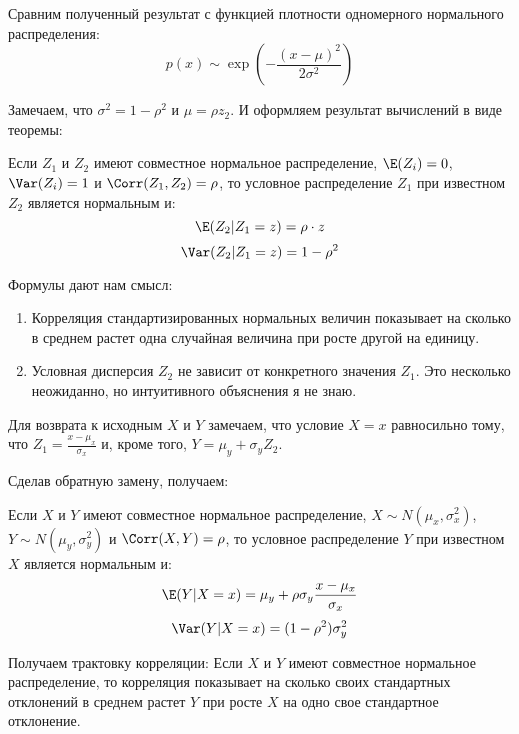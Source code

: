 Сравним полученный результат с функцией плотности одномерного нормального распределения:
\begin{equation}
p(x)\sim\exp\left(-\frac{(x-\mu)^{2}}{2\sigma^{2}}\right)
\end{equation}

Замечаем, что $\sigma^{2}=1-\rho^{2}$ и $\mu=\rho z_{2}$. И оформляем результат вычислений в виде теоремы:
\begin{myth}
Если $Z_{1}$ и $Z_{2}$ имеют совместное нормальное распределение, $\E(Z_{i})=0$, $\Var(Z_{i})=1$ и $\Corr(Z_{1},Z_{2})=\rho$, то условное распределение $Z_{1}$ при известном $Z_{2}$ является нормальным и:
\begin{equation}
\E(Z_{2}|Z_{1}=z)=\rho\cdot z
\end{equation}
\begin{equation}
\Var(Z_{2}|Z_{1}=z)=1-\rho^{2}
\end{equation}
\end{myth}

Формулы дают нам смысл:
\begin{enumerate}
\item Корреляция стандартизированных нормальных величин показывает на сколько в среднем растет одна случайная величина при росте другой на единицу.
\item Условная дисперсия $Z_{2}$ не зависит от конкретного значения $Z_{1}$. Это несколько неожиданно, но интуитивного объяснения я не знаю.
\end{enumerate}
 

Для возврата к исходным $X$ и $Y$ замечаем, что условие $X=x$ равносильно тому, что $Z_{1}=\frac{x-\mu_{x}}{\sigma_{x}}$ и, кроме того, $Y=\mu_{y}+\sigma_{y}Z_{2}$.

Сделав обратную замену, получаем:
\begin{myth}
Если $X$ и $Y$ имеют совместное нормальное распределение, $X\sim N(\mu_{x},\sigma^{2}_{x})$, $Y\sim N(\mu_{y},\sigma^{2}_{y})$ и $\Corr(X,Y)=\rho$, то условное распределение $Y$ при известном $X$ является нормальным и:
\begin{equation}
\E(Y|X=x)=\mu_{y}+\rho\sigma_{y}\frac{x-\mu_{x}}{\sigma_{x}}
\end{equation}
\begin{equation}
\Var(Y|X=x)=(1-\rho^{2})\sigma_{y}^{2}
\end{equation}
\end{myth}

Получаем трактовку корреляции: Если $X$ и $Y$ имеют совместное нормальное распределение, то корреляция  показывает на сколько своих стандартных отклонений в среднем растет $Y$  при росте $X$ на одно свое стандартное отклонение. 


